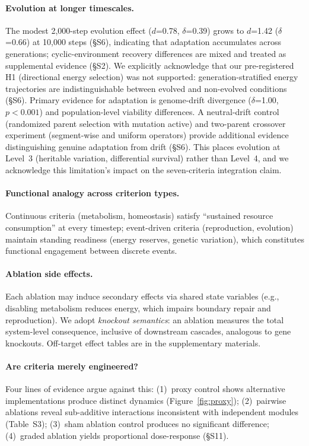 \documentclass[letterpaper]{article}
\begin{document}
\paragraph{Evolution at longer timescales.}
The modest 2,000-step evolution effect ($d$=0.78, $\delta$=0.39) grows to
$d$=1.42 ($\delta$=0.66) at 10,000 steps (§S6), indicating that adaptation
accumulates across generations; cyclic-environment recovery differences
are mixed and treated as supplemental evidence (§S2).
We explicitly acknowledge that our pre-registered H1 (directional energy
selection) was not supported: generation-stratified energy trajectories are
indistinguishable between evolved and non-evolved conditions (§S6).
Primary evidence for adaptation is genome-drift divergence
($\delta$=1.00, $p < 0.001$) and population-level viability differences.
A neutral-drift control (randomized parent selection with mutation active)
and two-parent crossover experiment (segment-wise and uniform operators)
provide additional evidence distinguishing genuine adaptation from drift
(§S6).
This places evolution at Level~3 (heritable variation, differential survival)
rather than Level~4, and we acknowledge this limitation's impact on the
seven-criteria integration claim.

\paragraph{Functional analogy across criterion types.}
Continuous criteria (metabolism, homeostasis) satisfy ``sustained resource
consumption'' at every timestep; event-driven criteria (reproduction,
evolution) maintain standing readiness (energy reserves, genetic variation),
which constitutes functional engagement between discrete events.

\paragraph{Ablation side effects.}
Each ablation may induce secondary effects via shared state variables (e.g.,
disabling metabolism reduces energy, which impairs boundary repair and
reproduction). We adopt \emph{knockout semantics}: an ablation measures the
total system-level consequence, inclusive of downstream cascades, analogous
to gene knockouts. Off-target effect tables are in the supplementary materials.

\paragraph{Are criteria merely engineered?}
Four lines of evidence argue against this: (1)~proxy control shows
alternative implementations produce distinct dynamics
(Figure~\ref{fig:proxy}); (2)~pairwise ablations reveal sub-additive
interactions inconsistent with independent modules
(Table~S3); (3)~sham ablation control produces no
significant difference; (4)~graded ablation yields proportional dose-response (§S11).
\end{document}
